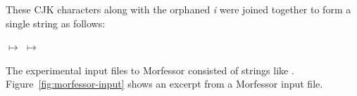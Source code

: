 {These CJK characters along with the orphaned \textit{i} were joined together to form a single string as follows:
\begin{center}
 \quad $\mapsto$ \quad {} \quad $\mapsto$ 
\quad {}
\end{center}
The experimental input files to Morfessor consisted of strings like . Figure~\ref{fig:morfessor-input} shows an excerpt from a Morfessor input file.

%
%
		
}
